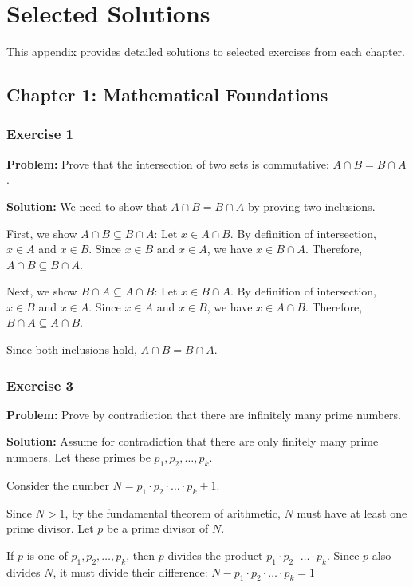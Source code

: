\chapter{Selected Solutions}

This appendix provides detailed solutions to selected exercises from each chapter.

\section{Chapter 1: Mathematical Foundations}

\subsection{Exercise 1}
\textbf{Problem:} Prove that the intersection of two sets is commutative: $A \cap B = B \cap A$.

\textbf{Solution:}
We need to show that $A \cap B = B \cap A$ by proving two inclusions.

First, we show $A \cap B \subseteq B \cap A$:
Let $x \in A \cap B$. By definition of intersection, $x \in A$ and $x \in B$.
Since $x \in B$ and $x \in A$, we have $x \in B \cap A$.
Therefore, $A \cap B \subseteq B \cap A$.

Next, we show $B \cap A \subseteq A \cap B$:
Let $x \in B \cap A$. By definition of intersection, $x \in B$ and $x \in A$.
Since $x \in A$ and $x \in B$, we have $x \in A \cap B$.
Therefore, $B \cap A \subseteq A \cap B$.

Since both inclusions hold, $A \cap B = B \cap A$.

\subsection{Exercise 3}
\textbf{Problem:} Prove by contradiction that there are infinitely many prime numbers.

\textbf{Solution:}
Assume for contradiction that there are only finitely many prime numbers. Let these primes be $p_1, p_2, \ldots, p_k$.

Consider the number $N = p_1 \cdot p_2 \cdot \ldots \cdot p_k + 1$.

Since $N > 1$, by the fundamental theorem of arithmetic, $N$ must have at least one prime divisor. Let $p$ be a prime divisor of $N$.

If $p$ is one of $p_1, p_2, \ldots, p_k$, then $p$ divides the product $p_1 \cdot p_2 \cdot \ldots \cdot p_k$. Since $p$ also divides $N$, it must divide their difference:
$N - p_1 \cdot p_2 \cdot \ldots \cdot p_k = 1$

